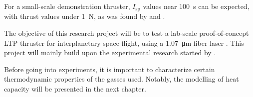         For a small-scale demonstration thruster, $I_\mathrm{sp}$ values near \qty{100}{s} can be expected, with thrust values under \qty{1}{N}, as was found by \textcite{toyodaThrustPerformanceCW2002} and \textcite{takanoDemonstrationDiodeLasersustained}.

        
        
        The objective of this research project will be to test a lab-scale proof-of-concept LTP thruster for interplanetary space flight, using a \qty{1.07}{μm} fiber laser . This project will mainly build upon the experimental research started by \textcite{duplayArgonLaserPlasmaThruster2024a}.
        
        Before going into experiments, it is important to characterize certain thermodynamic properties of the gasses used. Notably, the modelling of heat capacity will be presented in the next chapter.
